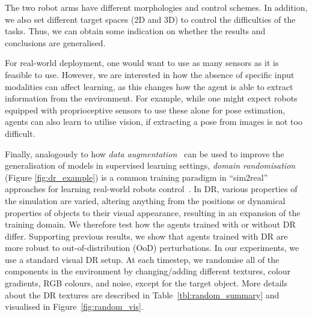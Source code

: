 {The two robot arms have different morphologies and control schemes. In addition,  we also set different target spaces (2D and 3D) to control the difficulties of the tasks. Thus, we can obtain some indication on whether the results and conclusions are generalised.}

For real-world deployment, one would want to use as many sensors as it is feasible to use. However, we are interested in how the absence of specific input modalities can affect learning, as this changes how the agent is able to extract information from the environment. For example, while one might expect robots equipped with proprioceptive sensors to use these alone for pose estimation, agents can also learn to utilise vision, if extracting a pose from images is not too difficult.

Finally, analogously to how \emph{data augmentation}~\cite{lecun1998gradient,shorten2019survey} can be used to improve the generalisation of models in supervised learning settings, \emph{domain randomisation} (Figure \ref{fig:dr_example}) is a common training paradigm in ``sim2real'' approaches for learning real-world robots control~\cite{andrychowicz2018learning,james2017transferring,peng2018sim,sadeghi2017cad2rl,tobin2017domain}. In DR, various properties of the simulation are varied, altering anything from the positions or dynamical properties of objects to their visual appearance, resulting in an expansion of the training domain. We therefore test how the agents trained with or without DR differ. Supporting previous results, we show that agents trained with DR are more robust to out-of-distribution (OoD) perturbations. In our experiments, we use a standard visual DR setup. At each timestep, we randomise all of the components in the environment by changing/adding different textures, colour gradients, RGB colours, and noise, except for the target object. More details about the DR textures are described in Table~\ref{tbl:random_summary} and visualised in Figure~\ref{fig:random_vis}.

